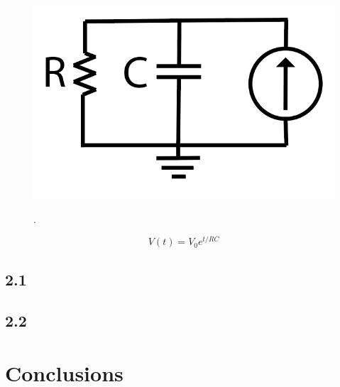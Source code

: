\documentclass[11pt]{article}
\begin{document}
\begin{figure}[H]
	\centering
	\centering
	\includegraphics[width = .95\textwidth]{RC.png}
	\caption{}.
	\label{fig:exp1.rc}
\end{figure}

\begin{equation} 
V(t) = V_0 e^{t/RC} 
\label{eq:rc}
\end{equation}

\subsection{2.1}

\subsection{2.2}


\section{Conclusions}





\end{document}
